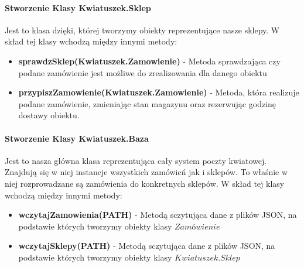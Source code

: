 \documentclass{article}
\begin{document}
        \paragraph{Stworzenie Klasy Kwiatuszek.Sklep} Jest to klasa dzięki, której tworzymy obiekty reprezentujące nasze sklepy. W skład tej klasy wchodzą między innymi metody:
        \begin{itemize}
            \item \textbf{sprawdzSklep(Kwiatuszek.Zamowienie)} - Metoda sprawdzająca czy podane zamówienie jest możliwe do zrealizowania dla danego obiektu
            \item \textbf{przypiszZamowienie(Kwiatuszek.Zamowienie)} - Metoda, która realizuje podane zamówienie, zmieniając stan magazynu oraz rezerwując godzinę dostawy obiektu.
        \end{itemize}
        \paragraph{Stworzenie Klasy Kwiatuszek.Baza} Jest to nasza główna klasa reprezentująca cały system poczty kwiatowej. Znajdują się w niej instancje wszystkich zamówień jak i sklepów. To właśnie w niej rozprowadzane są zamówienia do konkretnych sklepów. W skład tej klasy wchodzą między innymi metody:
        \begin{itemize}
            \item \textbf{wczytajZamowienia(PATH)} - Metodą sczytująca dane z plików JSON, na podstawie których tworzymy obiekty klasy $Zamówienie$
            \item \textbf{wczytajSklepy(PATH)} - Metodą sczytująca dane z plików JSON, na podstawie których tworzymy obiekty klasy $Kwiatuszek.Sklep$
        \end{itemize}
        
        
\end{document}
